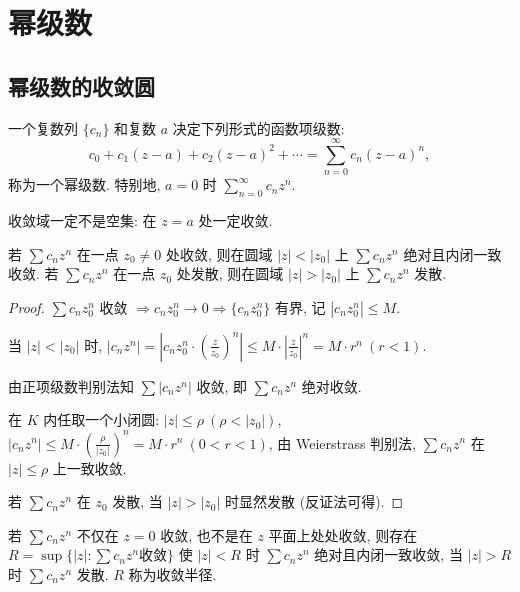 \documentclass[theorem=false,mathfont=none,openany,sub3section]{easybook}
\begin{document}
\newpage

\section{幂级数}

\subsection{幂级数的收敛圆}

\begin{definition}
  一个复数列 $\{c_{n}\}$ 和复数 $a$ 决定下列形式的函数项级数:
  \[
  c_{0}+c_{1}(z-a)+c_{2}(z-a)^{2}+\cdots=\sum_{n=0}^{\infty}c_{n}(z-a)^{n},
  \]
  称为一个幂级数. 特别地, $a=0$ 时 $\sum_{n=0}^{\infty}c_{n}z^{n}$.
\end{definition}

\begin{remark}
  收敛域一定不是空集: 在 $z=a$ 处一定收敛.
\end{remark}

\begin{theorem}[Abel 定理]
  若 $\sum c_{n}z^{n}$ 在一点 $z_{0}\neq0$ 处收敛, 则在圆域 $|z|<|z_{0}|$ 上 $\sum c_{n}z^{n}$ 绝对且内闭一致收敛.
  若 $\sum c_{n}z^{n}$ 在一点 $z_{0}$ 处发散, 则在圆域 $|z|>|z_{0}|$ 上 $\sum c_{n}z^{n}$ 发散.
\end{theorem}

\begin{proof}
  $\sum c_{n}z_{0}^{n}$ 收敛 $\Rightarrow c_{n}z_{0}^{n}\to0\Rightarrow\{c_{n}z_{0}^{n}\}$ 有界, 记 $|c_{n}z_{0}^{n}|\leq M$.

  当 $|z|<|z_{0}|$ 时, $|c_{n}z^{n}|=|c_{n}z_{0}^{n}\cdot(\frac{z}{z_{0}})^{n}|\leq M\cdot|\frac{z}{z_{0}}|^{n}=M\cdot r^{n}\ (r<1)$.

  由正项级数判别法知 $\sum|c_{n}z^{n}|$ 收敛, 即 $\sum c_{n}z^{n}$ 绝对收敛.

  在 $K$ 内任取一个小闭圆: $|z|\leq\rho\ (\rho<|z_{0}|)$,
  $|c_{n}z^{n}|\leq M\cdot(\frac{\rho}{|z_{0}|})^{n}=M\cdot r^{n}\ (0<r<1)$,
  由 Weierstrass 判别法, $\sum c_{n}z^{n}$ 在 $|z|\leq\rho$ 上一致收敛.

  若 $\sum c_{n}z^{n}$ 在 $z_{0}$ 发散, 当 $|z|>|z_{0}|$ 时显然发散 (反证法可得).
\end{proof}

\begin{corollary}
  若 $\sum c_{n}z^{n}$ 不仅在 $z=0$ 收敛, 也不是在 $z$ 平面上处处收敛, 则存在 $R=\sup\{|z|:\sum c_{n}z^{n}\text{收敛}\}$ 使 $|z|<R$ 时 $\sum c_{n}z^{n}$ 绝对且内闭一致收敛, 当 $|z|>R$ 时 $\sum c_{n}z^{n}$ 发散. $R$ 称为收敛半径.
\end{corollary}
\end{document}
